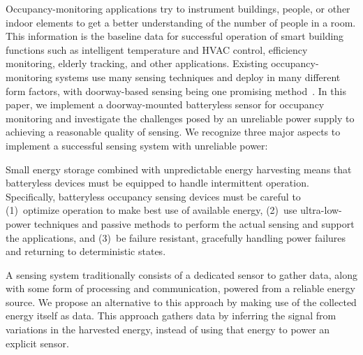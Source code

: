 Occupancy-monitoring applications try to instrument buildings, people, or other indoor elements to get a better understanding of the number of people in a room.
This information is the baseline data for successful operation of smart building functions such as intelligent temperature and HVAC control, efficiency monitoring, elderly tracking, and other applications.
Existing occupancy-monitoring systems use many sensing techniques and deploy in many different form factors, with doorway-based sensing being one promising method~\cite{hnat2012doorjamb, sonicdoor-buildsys2017}.
In this paper, we implement a doorway-mounted batteryless sensor for occupancy monitoring and investigate the challenges posed by an unreliable power supply to achieving a reasonable quality of sensing.
We recognize three major aspects to implement a successful sensing system with unreliable power:

Small energy storage combined with unpredictable energy harvesting means that batteryless devices must be equipped to handle intermittent operation.
Specifically, batteryless occupancy sensing devices must be careful to (1)~optimize operation to make best use of available energy, (2)~use ultra-low-power techniques and passive methods to perform the actual sensing and support the applications, and (3)~be failure resistant, gracefully handling power failures and returning to deterministic states.

A sensing system traditionally consists of a dedicated sensor to gather data, along with some form of processing and communication, powered from a reliable energy source.
We propose an alternative to this approach by making use of the collected energy itself as data.  This approach gathers data by inferring the signal from variations in the harvested energy, instead of using that energy to power an explicit sensor.  

